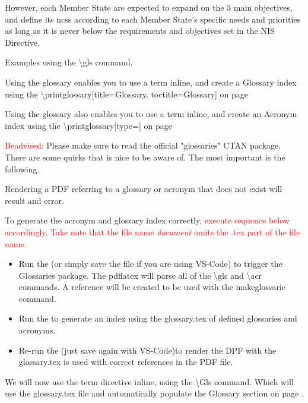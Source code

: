 {However, each Member State are expected to expand on the 3 main objectives, and define its \acrshort{ncss} according to each Member State's specific needs and priorities as long as it is never below the requirements and objectives set in the NIS Directive.

\begin{notes}
    Examples using the \textbackslash gls command.

    Using the glossary enables you to use a term inline, and create a Glossary index using the \textbackslash printglossary[title=Glossary, toctitle=Glossary] on page \pageref{sec:glossary}

    Using the glossary also enables you to use a term inline, and create an Acronym index using the \textbackslash printglossary[type=\acronymtype] on page \pageref{sec:acronym}

    \textcolor{red}{Beadvised:} Please make sure to read the official "glossaries" CTAN package. There are some quirks that is nice to be aware of. The most important is the following.

    Rendering a PDF referring to a glossary or acronym that does not exist will result and error.

    To generate the acronym and glossary index correctly, \textcolor{red}{execute sequence below accordingly. Take note that the file name \emph{document} omits the .tex part of the file name.} 
    
    \begin{itemize}
        \item Run the \textcolor{green}{} (or simply save the file if you are using VS-Code) to trigger the Glossaries package. The pdflatex will parse all of the \textbackslash gls and \textbackslash acr commands. A reference will be created to be used with the makeglossarie command.
        \item Run the \textcolor{green}{} to generate an index using the glossary.tex of defined glossaries and acronyms. 
        \item Re-run the \textcolor{green}{} (just save again with VS-Code)to render the DPF with the glossary.tex is used with correct references in the PDF file.
    \end{itemize}
\end{notes}


We will now use the term \Gls{directive} inline, using the \textbackslash Gls command. Which will use the glossary.tex file and automatically populate the Glossary section on page \pageref{sec:glossary}.

}
